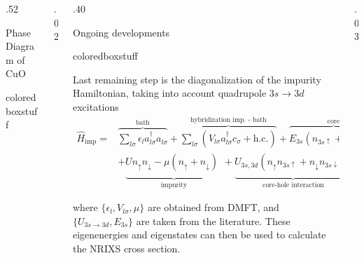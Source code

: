 \documentclass[final, hyperref={pdfpagelabels=false}]{beamer}
\begin{document}
\begin{frame}[t]
\begin{columns}[t]
\begin{column}{.52\textwidth}
\begin{block}{\color{ta2orange!30!tabutter!30} Phase Diagram of CuO\vphantom{Xy}}
\begin{beamercolorbox}[wd=\textwidth]{coloredboxstuff}
\end{beamercolorbox}
\end{block}
\end{column}

\begin{column}{.02\textwidth}
\end{column}	%

\begin{column}{.40\textwidth} %
\begin{block}{\color{ta2orange!30!tabutter!30} Ongoing developments\vphantom{Xy}}
\begin{beamercolorbox}[wd=\textwidth]{coloredboxstuff}

Last remaining step is the diagonalization of the impurity Hamiltonian, taking into account quadrupole $3s \rightarrow 3d$ excitations
\vspace{0.45em}
\begin{align*}
\hat{H}_{\text{imp}} = & \overbrace{\sum_{l\sigma}^{\phantom{.}}\epsilon_la_{l\sigma}^{\dagger}a_{l\sigma}^{\phantom{\dagger}}}^{\text{bath}}+ \overbrace{\sum_{l\sigma}^{\phantom{.}}\left(V_{l\sigma}a_{l\sigma}^{\dagger}c_{\sigma}^{\phantom{\dagger}}+ \text{h.c.} \right)}^{\text{hybridization imp. - bath}} + \overbrace{E_{3s} \left( n_{3s\uparrow} + n_{3s\downarrow}\right)^{\phantom{Y}}}^{\text{core}} \\
& + \underbrace{Un_\uparrow n_\downarrow - \mu  \left( n_\uparrow + n_\downarrow \right)_{\phantom{p}}}_{\text{impurity}} + \underbrace{U_{3s,3d} \left( n_{\uparrow} n_{3s\uparrow}+n_{\downarrow} n_{3s\downarrow}\right)_{\phantom{y}}}_{\text{core-hole interaction}}
\end{align*}

\vspace{0.35em}

where $\{\epsilon_l, V_{l\sigma}, \mu \}$ are obtained from DMFT, and $\{U_{3s \rightarrow 3d}, E_{3s} \}$ are taken from the literature. These eigenenergies and eigenstates can then be used to calculate the NRIXS cross section.

\vspace{1.05em}
\end{beamercolorbox}
\end{block}
\end{column}

\begin{column}{.03\textwidth}
\end{column} %
\end{columns}
\vspace{-0.75em}


\end{frame}
\end{document}
